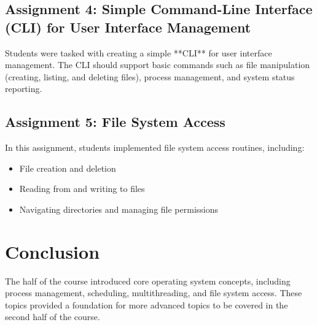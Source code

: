 \documentclass[12pt]{article}
\begin{document}
\subsection{Assignment 4: Simple Command-Line Interface (CLI) for User Interface Management}
Students were tasked with creating a simple **CLI** for user interface management. The CLI should support basic commands such as file manipulation (creating, listing, and deleting files), process management, and system status reporting.

\subsection{Assignment 5: File System Access}
In this assignment, students implemented file system access routines, including:
\begin{itemize}
    \item File creation and deletion
    \item Reading from and writing to files
    \item Navigating directories and managing file permissions
\end{itemize}

\section{Conclusion}
The  half of the course introduced core operating system concepts, including process management, scheduling, multithreading, and file system access. These topics provided a foundation for more advanced topics to be covered in the second half of the course.
\end{document}
